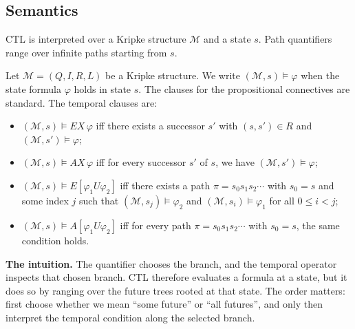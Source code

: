 \subsection{Semantics}

CTL is interpreted over a Kripke structure $\mathcal{M}$ and a state $s$.
Path quantifiers range over infinite paths starting from $s$.

\begin{definition}
\label{def:ctl-semantics}
Let $\mathcal{M} = (Q, I, R, L)$ be a Kripke structure.  We write
$(\mathcal{M}, s) \models \varphi$ when the state formula $\varphi$ holds in
state $s$.  The clauses for the propositional connectives are standard.  The
temporal clauses are:
\begin{itemize}
  \item $(\mathcal{M}, s) \models EX\,\varphi$ iff there exists a successor
        $s'$ with $(s,s') \in R$ and $(\mathcal{M}, s') \models \varphi$;
  \item $(\mathcal{M}, s) \models AX\,\varphi$ iff for every successor $s'$
        of $s$, we have $(\mathcal{M}, s') \models \varphi$;
  \item $(\mathcal{M}, s) \models E[\varphi_1 U \varphi_2]$ iff there exists
        a path $\pi = s_0 s_1 s_2 \cdots$ with $s_0 = s$ and some index $j$
        such that $(\mathcal{M}, s_j) \models \varphi_2$ and
        $(\mathcal{M}, s_i) \models \varphi_1$ for all $0 \le i < j$;
  \item $(\mathcal{M}, s) \models A[\varphi_1 U \varphi_2]$ iff for every
        path $\pi = s_0 s_1 s_2 \cdots$ with $s_0 = s$, the same condition
        holds.
\end{itemize}
\end{definition}

\medskip\noindent
\textbf{The intuition.}  The quantifier chooses the branch, and the temporal
operator inspects that chosen branch.  CTL therefore evaluates a formula at a
state, but it does so by ranging over the future trees rooted at that state.
The order matters: first choose whether we mean ``some future'' or ``all
futures'', and only then interpret the temporal condition along the selected
branch.

